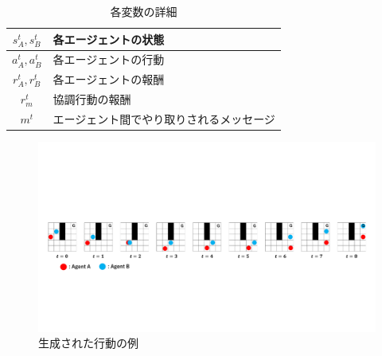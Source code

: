 \documentclass[twocolumn,a4j]{jarticle}
\begin{document}
%
\begin{table}[t]
  \caption{各変数の詳細}
  \label{tbl:params}
  \centering
  \small
  \begin{tabular}{|c|l|} \hline

    $s^t_{A}, s^t_{B}$	&各エージェントの状態 \\ \hline
    $a^t_{A}, a^t_{B}$	&各エージェントの行動 \\ \hline
    $r^t_{A}, r^t_{B}$	&各エージェントの報酬 \\ \hline
    $r^t_{m}$	&協調行動の報酬 \\ \hline
   $m^t$		&エージェント間でやり取りされるメッセージ \\ \hline
  \end{tabular}
\end{table}
%

\begin{figure}[t]
	\begin{center}
	\includegraphics[scale=0.53]{fig/planning.pdf}
	\vspace{-10 mm}
	\caption{生成された行動の例}
	\label{fig:planning}
	\end{center}
\end{figure}
\end{document}
